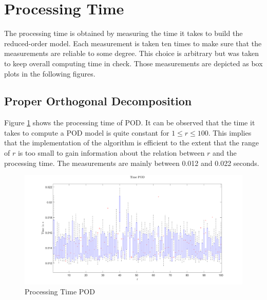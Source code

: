 \section{Processing Time}
The processing time is obtained by measuring the time it takes to build the reduced-order model.
Each measurement is taken ten times to make sure that the measurements are reliable to some degree.
This choice is arbitrary but was taken to keep overall computing time in check.
Those measurements are depicted as box plots in the following figures.

\subsection{Proper Orthogonal Decomposition}
Figure \ref{FIG-T-POD} shows the processing time of POD.
It can be observed that the time it takes to compute a POD model is quite constant for  \(1 \leq r \leq 100\).
This implies that the implementation of the algorithm is efficient to the extent that the range of \(r\) is too small to gain information about the relation between \(r\) and the processing time.
The measurements are mainly between 0.012 and 0.022 seconds.
\begin{figure}[H]
\centering
\includegraphics[width=\textwidth]{images/time/POD}
\caption{Processing Time POD}
\label{FIG-T-POD}
\end{figure}

